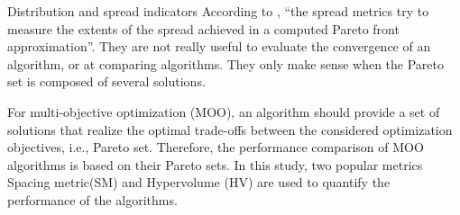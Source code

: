             Distribution and spread indicators According to \cite{CustodioMVV11}, “the spread metrics try to measure the extents of the spread achieved in a computed Pareto front approximation”. They are not really useful to evaluate the convergence of an algorithm, or at comparing algorithms. They only make sense when the Pareto set is composed of several solutions.
        
            For multi-objective optimization (MOO), an algorithm
            should provide a set of solutions that realize the optimal trade-offs between the considered optimization objectives, 
            i.e., Pareto set. Therefore, the performance comparison of MOO algorithms is based on their Pareto sets.
            In this study, two popular metrics Spacing metric(SM) and Hypervolume (HV) are used to quantify the performance of the algorithms. \cite{DBLP:journals/corr/abs-1812-07958}
           

